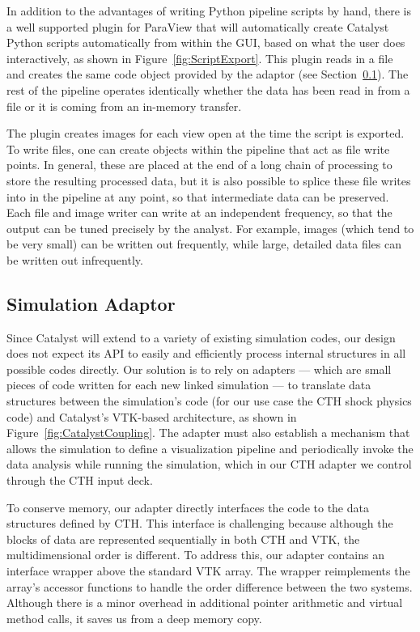 In addition to the advantages of writing Python pipeline scripts by hand, there
is a well supported plugin for ParaView that will automatically create Catalyst
Python scripts automatically from within the GUI, based on what the user
does interactively, as shown in Figure~\ref{fig:ScriptExport}.  This plugin 
reads in a file and creates the same code 
object provided by the adaptor (see Section~\ref{sec:Adaptor}).  The rest of the
pipeline operates identically whether the data has been read in from a file
or it is coming from an in-memory \insitu transfer.  

The plugin creates images for each view open at the time the script is 
exported. 
To write files, one can create objects
within the pipeline that act as file write points.  In general, these are 
placed
at the end of a long chain of processing to store the resulting processed data,
but it is also possible to splice these file writes into in the pipeline at
any point, so that intermediate data can be preserved. 
Each file and image writer
can write at an independent frequency, so that the output can be tuned 
precisely by the analyst.  For example, images (which tend to be very small) 
can be written out frequently, while large, detailed data files can be written out 
infrequently.

\subsection{Simulation Adaptor}\label{sec:Adaptor}

Since Catalyst will extend to a variety of existing simulation codes, our
design does not expect its API to easily and efficiently process internal
structures in all possible codes directly.  Our solution is to rely on
adapters --- which are small pieces of code written for each new linked
simulation --- to translate data structures between the simulation's code
(for our use case the CTH shock physics code) and Catalyst's VTK-based
architecture, as shown in Figure~\ref{fig:CatalystCoupling}.  The adapter
must also establish a mechanism that allows the simulation to define a
visualization pipeline and periodically invoke the data analysis while running
the simulation, which in our CTH adapter we control through the CTH input
deck.

To conserve memory, our adapter directly interfaces the \vda code to the
data structures defined by CTH.  This interface is challenging because
although the blocks of data are represented sequentially in both CTH and
VTK, the multidimensional order is different.  To address this, our adapter
contains an interface wrapper above the standard VTK array.  The wrapper
reimplements the array's accessor functions to handle the order difference
between the two systems.  Although there is a minor overhead in additional
pointer arithmetic and virtual method calls, it saves us from a deep memory
copy.

